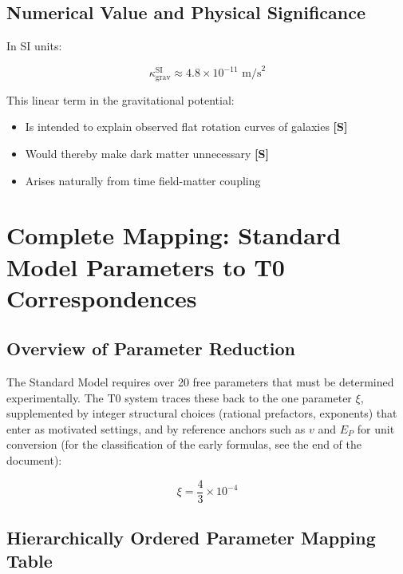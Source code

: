 	\subsection{Numerical Value and Physical Significance}
	
	In SI units:
	
	\begin{equation}
		\kappa_{\text{grav}}^{\text{SI}} \approx 4.8 \times 10^{-11} \text{ m/s}^2
	\end{equation}
	
	This linear term in the gravitational potential:
	\begin{itemize}
		\item Is intended to explain observed flat rotation curves of galaxies \textbf{[S]}
		\item Would thereby make dark matter unnecessary \textbf{[S]}
		\item Arises naturally from time field-matter coupling
	\end{itemize}
	
\section{Complete Mapping: Standard Model Parameters to T0 Correspondences}
\label{sec:sm_t0_mapping}

\subsection{Overview of Parameter Reduction}
\label{subsec:parameter_overview}

The Standard Model requires over 20 free parameters that must be determined experimentally. The T0 system traces these back to the one parameter $\xi$, supplemented by integer structural choices (rational prefactors, exponents) that enter as motivated settings, and by reference anchors such as $v$ and $E_P$ for unit conversion (for the classification of the early formulas, see the end of the document):

\begin{equation}
	\boxed{\xi = \frac{4}{3} \times 10^{-4}}
\end{equation}

\subsection{Hierarchically Ordered Parameter Mapping Table}
\label{subsec:hierarchical_mapping}

